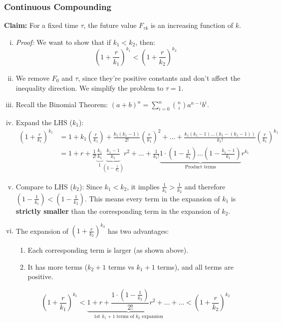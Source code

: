 \subsubsection{Continuous Compounding}
\textbf{Claim: } For a fixed time \(\tau\), the future value \(F_{\tau k}\) is an increasing function of \(k\).
\begin{enumerate}[i.]
    \item \textit{Proof: } We want to show that if \(k_1 < k_2\), then:
    \begin{equation*}
        \left(1 + \frac{r}{k_1}\right)^{k_1} < \left(1 + \frac{r}{k_2}\right)^{k_2}
    \end{equation*}

    \item We remove \(F_0\) and \(\tau\), since they're positive constants and don't affect the inequality direction. We simplify the problem to \(\tau = 1\).

    \item Recall the Binomial Theorem: $(a+b)^n = \sum_{i=0}^n \binom{n}{i} a^{n-i} b^i$.

    \item Expand the LHS (\(k_1\)):
    \begin{align*}
    \left(1 + \frac{r}{k_1}\right)^{k_1} &= 1 + k_1 \left(\frac{r}{k_1}\right) + \frac{k_1(k_1-1)}{2!} \left(\frac{r}{k_1}\right)^2 + \dots + \frac{k_1(k_1-1)\dots(k_1-(k_1-1))}{k_1!} \left(\frac{r}{k_1}\right)^{k_1} \\
    &= 1 + r + \frac{1}{2!} \underbrace{\frac{k_1}{k_1}}_{1} \underbrace{\frac{k_1-1}{k_1}}_{(1-\frac{1}{k_1})} r^2 + \dots + \frac{1}{k_1!} \underbrace{1 \cdot \left(1-\frac{1}{k_1}\right) \dots \left(1-\frac{k_1-1}{k_1}\right)}_{\text{Product terms}} r^{k_1}
    \end{align*}

    \item Compare to LHS (\(k_2\)):
    Since \(k_1 < k_2\), it implies $\frac{1}{k_1} > \frac{1}{k_2}$ and therefore \(\left(1 - \frac{1}{k_1}\right) < \left(1 - \frac{1}{k_2}\right)\). This means every term in the expansion of \(k_1\) is \textbf{strictly smaller} than the corresponding term in the expansion of \(k_2\).

    \item The expansion of $(1 + \frac{r}{k_2})^{k_2}$ has two advantages:
    \begin{enumerate}
        \item Each corresponding term is larger (as shown above).
        \item It has more terms ($k_2 + 1$ terms vs $k_1 + 1$ terms), and all terms are positive.
    \end{enumerate}
    \[
    \left(1 + \frac{r}{k_1}\right)^{k_1} < \underbrace{1 + r + \frac{1 \cdot (1-\frac{1}{k_2})}{2!}r^2 + \dots}_{\text{1st } k_1+1 \text{ terms of } k_2 \text{ expansion}} + \dots < \left(1 + \frac{r}{k_2}\right)^{k_2}
    \]
\end{enumerate}


